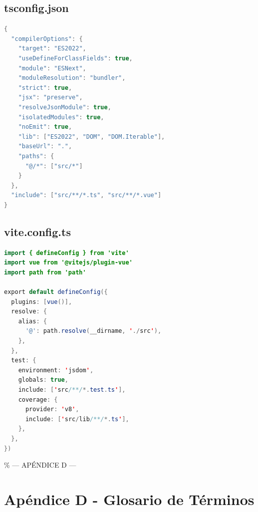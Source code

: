 \documentclass[11pt,a4paper]{article}
\begin{document}
\subsection{tsconfig.json}
\begin{lstlisting}[language=Java, caption={tsconfig.json}]
{
  "compilerOptions": {
    "target": "ES2022",
    "useDefineForClassFields": true,
    "module": "ESNext",
    "moduleResolution": "bundler",
    "strict": true,
    "jsx": "preserve",
    "resolveJsonModule": true,
    "isolatedModules": true,
    "noEmit": true,
    "lib": ["ES2022", "DOM", "DOM.Iterable"],
    "baseUrl": ".",
    "paths": {
      "@/*": ["src/*"]
    }
  },
  "include": ["src/**/*.ts", "src/**/*.vue"]
}
\end{lstlisting}

\subsection{vite.config.ts}
\begin{lstlisting}[language=Java, caption={vite.config.ts}]
import { defineConfig } from 'vite'
import vue from '@vitejs/plugin-vue'
import path from 'path'

export default defineConfig({
  plugins: [vue()],
  resolve: {
    alias: {
      '@': path.resolve(__dirname, './src'),
    },
  },
  test: {
    environment: 'jsdom',
    globals: true,
    include: ['src/**/*.test.ts'],
    coverage: {
      provider: 'v8',
      include: ['src/lib/**/*.ts'],
    },
  },
})
\end{lstlisting}

\newpage

\% --- APÉNDICE D ---
\section{Apéndice D - Glosario de Términos}
\end{document}

